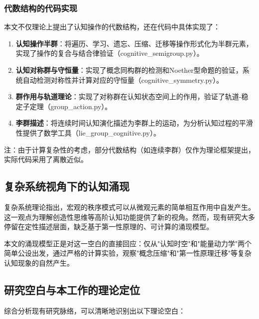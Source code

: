 \documentclass[12pt,a4paper]{article}
\begin{document}
\subsubsection{代数结构的代码实现}

本文不仅理论上提出了认知操作的代数结构，还在代码中具体实现了：
\begin{enumerate}
\item \textbf{认知操作半群}：将遍历、学习、遗忘、压缩、迁移等操作形式化为半群元素，实现了操作的复合与结合律验证（cognitive\_semigroup.py）。
   
\item \textbf{认知对称群与守恒量}：实现了概念同构群的检测和Noether型命题的验证，系统自动检测对称性并计算对应的守恒量（cognitive\_symmetry.py）。
   
\item \textbf{群作用与轨道理论}：实现了对称群在认知状态空间上的作用，验证了轨道-稳定子定理（group\_action.py）。
   
\item \textbf{李群描述}：将连续时间认知演化描述为李群上的运动，为分析认知过程的平滑性提供了数学工具（lie\_group\_cognitive.py）。
\end{enumerate}

注：由于计算复杂性的考虑，部分代数结构（如连续李群）仅作为理论框架提出，实际代码采用了离散近似。

\subsection{复杂系统视角下的认知涌现}

复杂系统理论指出，宏观的秩序模式可以从微观元素的简单相互作用中自发产生。这一观点为理解创造性思维等高阶认知功能提供了新的视角。然而，现有研究大多停留在定性描述层面，缺乏基于第一性原理的、可计算的涌现模型。

本文的涌现模型正是对这一空白的直接回应：仅从"认知时空"和"能量动力学"两个简单公设出发，通过严格的计算实验，观察"概念压缩"和"第一性原理迁移"等复杂认知现象的自然产生。

\subsection{研究空白与本工作的理论定位}
\label{subsec:research_gaps_positioning}

综合分析现有研究脉络，可以清晰地识别出以下理论空白：
\end{document}
